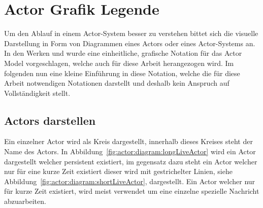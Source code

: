 \section{Actor Grafik Legende}\label{actor:diagram:description}
Um den Ablauf in einem Actor-System besser zu verstehen bittet sich die visuelle Darstellung in Form von Diagrammen eines Actors oder eines Actor-Systems an. In den Werken \cite{kuhn2017reactive} und \cite{Vernon2015ReactiveAkka} wurde eine einheitliche, grafische Notation für das Actor Model vorgeschlagen, welche auch für diese Arbeit herangezogen wird. Im folgenden nun eine kleine Einführung in diese Notation, welche die für diese Arbeit notwendigen Notationen darstellt und deshalb kein Anspruch auf Vollständigkeit stellt.\\
\subsection{Actors darstellen}
    Ein einzelner Actor wird als Kreis dargestellt, innerhalb dieses Kreises steht der Name des Actors. In Abbildung~\ref{fig:actor:diagram:longLiveActor} wird ein Actor dargestellt welcher persistent existiert, im gegensatz dazu steht ein Actor welcher nur für eine kurze Zeit existiert dieser wird mit gestrichelter Linien, siehe Abbildung~\ref{fig:actor:diagram:shortLiveActor}, dargestellt. Ein Actor welcher nur für kurze Zeit existiert, wird meist verwendet um eine einzelne spezielle Nachricht abzuarbeiten.
